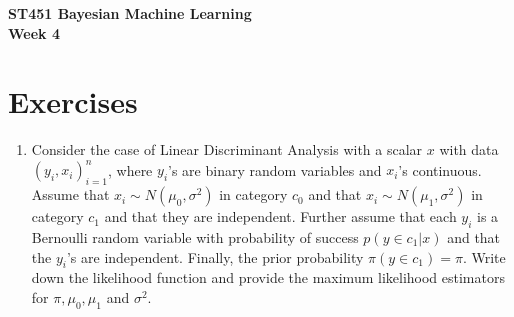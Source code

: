 \documentclass[fleqn]{article}
\begin{document}
\begin{center}
\Large {\bf ST451 Bayesian Machine Learning\\
Week 4
}
\end{center}

\normalsize
%
\vspace{1.0cm}
%
\section*{Exercises}
\begin{enumerate} 
\item Consider the case of Linear Discriminant Analysis with a scalar $x$ with data $(y_i,x_i)_{i=1}^n$, where $y_i$'s are binary random variables and $x_i$'s continuous. Assume that $x_i\sim N(\mu_0,\sigma^2)$ in category $c_0$ and that $x_i\sim N(\mu_1,\sigma^2)$ in category $c_1$ and that they are independent. Further assume that each $y_i$ is a Bernoulli random variable with probability of success $p(y\in c_1|x)$ and that the $y_i$'s are independent. Finally, the prior probability $\pi(y\in c_1)=\pi$. Write down the likelihood function and provide the maximum likelihood estimators for $\pi,\mu_0,\mu_1$ and $\sigma^2$.


\end{enumerate}
\end{document}
